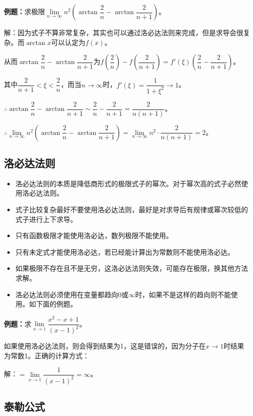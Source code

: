 \documentclass[UTF8, 12pt]{ctexart}
\begin{document}
\textbf{例题：}求极限$\lim\limits_{n\to\infty}n^2\left(\arctan\dfrac{2}{n}-\arctan\dfrac{2}{n+1}\right)$。\medskip

解：因为式子不算非常复杂，其实也可以通过洛必达法则来完成，但是求导会很复杂。而$\arctan x$可以认定为$f(x)$。

从而$\arctan\dfrac{2}{n}-\arctan\dfrac{2}{n+1}$为$f(\dfrac{2}{n})-f(\dfrac{2}{n+1})=f'(\xi)\left(\dfrac{2}{n}-\dfrac{2}{n+1}\right)$。

其中$\dfrac{2}{n+1}<\xi<\dfrac{2}{n}$，而当$n\to\infty$时，$f'(\xi)=\dfrac{1}{1+\xi^2}\to 1$。

$\therefore\arctan\dfrac{2}{n}-\arctan\dfrac{2}{n+1}\sim\dfrac{2}{n}-\dfrac{2}{n+1}=\dfrac{2}{n(n+1)}$。

$\therefore\lim\limits_{n\to\infty}n^2\left(\arctan\dfrac{2}{n}-\arctan\dfrac{2}{n+1}\right)=\lim\limits_{n\to\infty}n^2\cdot\dfrac{2}{n(n+1)}=2$。

\subsection{洛必达法则}

\begin{itemize}
    \item 洛必达法则的本质是降低商形式的极限式子的幂次。对于幂次高的式子必然使用洛必达法则。
    \item 式子比较复杂最好不要使用洛必达法则，最好是对求导后有规律或幂次较低的式子进行上下求导。
    \item 只有函数极限才能使用洛必达，数列极限不能使用。
    \item 只有未定式才能使用洛必达，若已经能计算出为常数则不能使用洛必达。
    \item 如果极限不存在且不是无穷，这洛必达法则失效，可能存在极限，换其他方法求解。
    \item 洛必达法则必须使用在变量都趋向0或$\infty$时，如果不是这样的趋向则不能使用。如下面的例题。
\end{itemize}

\textbf{例题：}求$\lim\limits_{x\to 1}\dfrac{x^2-x+1}{(x-1)^2}$。

如果使用洛必达法则，则会得到结果为1，这是错误的，因为分子在$x\to 1$时结果为常数1。正确的计算方式：

解：$=\lim\limits_{x\to 1}\dfrac{1}{(x-1)^2}=\infty$。

\subsection{泰勒公式}
\end{document}
